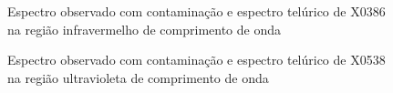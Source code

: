 \begin{figure}[htb]
  \centering
  \hfill
  \caption{Espectro observado com contaminação e espectro telúrico de X0386 na região infravermelho de comprimento de onda}
  \label{fig:x0386-infrared}
\end{figure}


\begin{figure}[htb]
  \centering
  \hfill
  \caption{Espectro observado com contaminação e espectro telúrico de X0538 na região ultravioleta de comprimento de onda}
  \label{fig:x0538-ultraviolet}
\end{figure}


